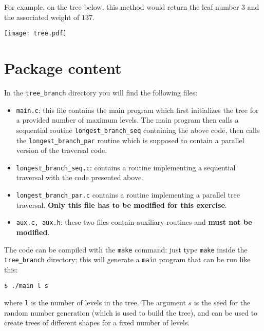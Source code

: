 \documentclass{article}
\begin{document}
For example, on the tree below, this method would return the leaf
number $3$ and the associated weight of $137$.

\begin{center}
  \texttt{[image: tree.pdf]}
\end{center}


\section{Package content}
In the \texttt{tree\_branch} directory you will find the
following files:
\begin{itemize}
\item \texttt{main.c}: this file contains the main program which first
  initializes the tree for a provided number of maximum levels. The main
  program then calls a sequential routine \texttt{longest\_branch\_seq}
  containing the above code, then calls the
  \texttt{longest\_branch\_par} routine which is supposed to contain a
  parallel version of the traversal code.
\item \texttt{longest\_branch\_seq.c}: contains a routine implementing a
  sequential traversal with the code presented above.
\item \texttt{longest\_branch\_par.c} contains a routine implementing a
  parallel tree traversal. \textbf{Only this file has to be modified
    for this exercise}.
\item \texttt{aux.c, aux.h}: these two files contain auxiliary
  routines and \textbf{must not be modified}.
\end{itemize}



The code can be compiled with the \texttt{make} command: just type
\texttt{make} inside the \texttt{tree\_branch} directory; this
will generate a \texttt{main} program that can be run like this:

\begin{verbatim}
$ ./main l s
\end{verbatim}

where \texttt{l} is the number of levels in the tree. The argument $s$
is the seed for the random number generation (which is used to build
the tree), and can be used to create trees of different shapes for a
fixed number of levels.
\end{document}
